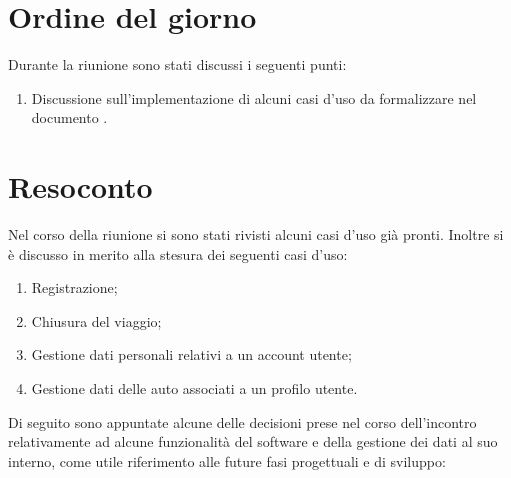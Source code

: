 \documentclass[a4paper, 12pt]{article}
\begin{document}
	
	
	
\newpage
\section{Ordine del giorno}
Durante la riunione sono stati discussi i seguenti punti:
\begin{enumerate}
	\item Discussione sull'implementazione di alcuni casi d'uso da formalizzare nel documento \AdR .
\end{enumerate}
	

\newpage
\section{Resoconto}
Nel corso della riunione si sono stati rivisti alcuni casi d'uso già pronti. Inoltre si è discusso in merito alla stesura dei seguenti casi d'uso:	
\begin{enumerate}
    \item Registrazione;
	\item Chiusura del viaggio;
	\item Gestione dati personali relativi a un account utente;
	\item Gestione dati delle auto associati a un profilo utente.
\end{enumerate}
Di seguito sono appuntate alcune delle decisioni prese nel corso dell'incontro relativamente ad alcune funzionalità del software e della gestione dei dati al suo interno, come utile riferimento alle future fasi progettuali e di sviluppo:
\end{document}
